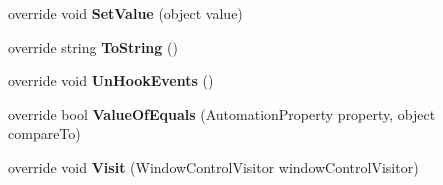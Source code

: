 \begin{DoxyCompactItemize}
\item 
\hypertarget{class_proto_test_1_1_golem_1_1_white_1_1_elements_1_1_white_spinner_a7876b30c4449622801fff060a9363c0e}{override void {\bfseries Set\-Value} (object value)}\label{class_proto_test_1_1_golem_1_1_white_1_1_elements_1_1_white_spinner_a7876b30c4449622801fff060a9363c0e}

\item 
\hypertarget{class_proto_test_1_1_golem_1_1_white_1_1_elements_1_1_white_spinner_a7dc38e33884221780762ff742710c7cf}{override string {\bfseries To\-String} ()}\label{class_proto_test_1_1_golem_1_1_white_1_1_elements_1_1_white_spinner_a7dc38e33884221780762ff742710c7cf}

\item 
\hypertarget{class_proto_test_1_1_golem_1_1_white_1_1_elements_1_1_white_spinner_ad4764dbfe2319d7ba7af206c3e721e19}{override void {\bfseries Un\-Hook\-Events} ()}\label{class_proto_test_1_1_golem_1_1_white_1_1_elements_1_1_white_spinner_ad4764dbfe2319d7ba7af206c3e721e19}

\item 
\hypertarget{class_proto_test_1_1_golem_1_1_white_1_1_elements_1_1_white_spinner_ab58c8151f9ab3d4493d034d5df92e6e1}{override bool {\bfseries Value\-Of\-Equals} (Automation\-Property property, object compare\-To)}\label{class_proto_test_1_1_golem_1_1_white_1_1_elements_1_1_white_spinner_ab58c8151f9ab3d4493d034d5df92e6e1}

\item 
\hypertarget{class_proto_test_1_1_golem_1_1_white_1_1_elements_1_1_white_spinner_add123f4ca728ab2e1814f8047a7a3f24}{override void {\bfseries Visit} (Window\-Control\-Visitor window\-Control\-Visitor)}\label{class_proto_test_1_1_golem_1_1_white_1_1_elements_1_1_white_spinner_add123f4ca728ab2e1814f8047a7a3f24}

\end{DoxyCompactItemize}
